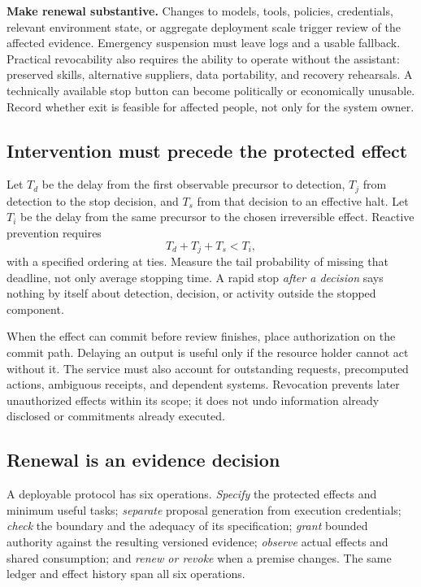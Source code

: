 \documentclass[10pt,twocolumn,letterpaper]{article}
\newcommand{\para}[1]{\smallskip\noindent\textbf{#1}\enspace}
\begin{document}
\para{Make renewal substantive.} Changes to models, tools, policies, credentials, relevant environment state, or aggregate deployment scale trigger review of the affected evidence. Emergency suspension must leave logs and a usable fallback. Practical revocability also requires the ability to operate without the assistant: preserved skills, alternative suppliers, data portability, and recovery rehearsals. A technically available stop button can become politically or economically unusable. Record whether exit is feasible for affected people, not only for the system owner.

\subsection{Intervention must precede the protected effect}
\label{sec:timing}
Let $T_d$ be the delay from the first observable precursor to detection, $T_j$ from detection to the stop decision, and $T_s$ from that decision to an effective halt. Let $T_i$ be the delay from the same precursor to the chosen irreversible effect. Reactive prevention requires
\[
T_d+T_j+T_s<T_i,
\]
with a specified ordering at ties. Measure the tail probability of missing that deadline, not only average stopping time. A rapid stop \emph{after a decision} says nothing by itself about detection, decision, or activity outside the stopped component.

When the effect can commit before review finishes, place authorization on the commit path. Delaying an output is useful only if the resource holder cannot act without it. The service must also account for outstanding requests, precomputed actions, ambiguous receipts, and dependent systems. Revocation prevents later unauthorized effects within its scope; it does not undo information already disclosed or commitments already executed.

\subsection{Renewal is an evidence decision}
A deployable protocol has six operations. \emph{Specify} the protected effects and minimum useful tasks; \emph{separate} proposal generation from execution credentials; \emph{check} the boundary and the adequacy of its specification; \emph{grant} bounded authority against the resulting versioned evidence; \emph{observe} actual effects and shared consumption; and \emph{renew or revoke} when a premise changes. The same ledger and effect history span all six operations.
\end{document}
